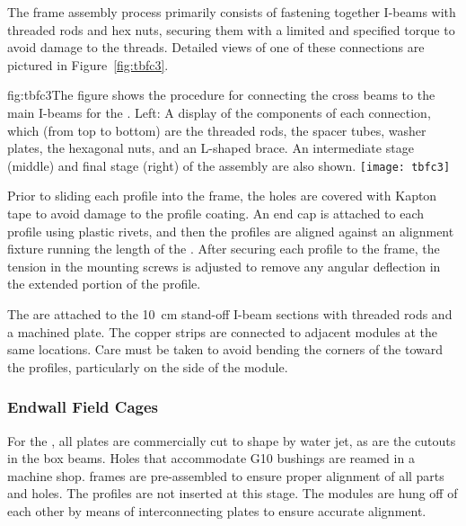 The  frame assembly process primarily consists of fastening together  I-beams with  threaded rods and hex nuts,  securing them with a limited and specified torque to avoid damage to the threads. Detailed views of one of these connections are pictured in Figure~\ref{fig:tbfc3}.

\begin{dunefigure}{fig:tbfc3}{The figure shows the procedure for connecting the cross beams to the main I-beams for the . Left: A display of the components of each connection, which (from top to bottom) are the threaded rods, the spacer tubes, washer plates, the hexagonal nuts, and an L-shaped  brace. An intermediate stage (middle) and final stage (right) of the assembly are also shown.}
\texttt{[image: tbfc3]}
\end{dunefigure}

Prior to sliding each profile into the  frame, the holes %
are covered with Kapton tape to avoid damage to the profile coating. An end cap is attached to each profile using plastic rivets, and then the profiles are aligned against an alignment fixture running the length of the . After securing each profile to the frame, the tension in the mounting screws is adjusted to remove any angular deflection in the extended portion of the profile.

The  are attached to the \SI{10}{\cm} stand-off I-beam sections with threaded rods and a machined plate. The copper strips are connected to adjacent modules at the same locations. Care must be taken to avoid bending the corners of the  toward the profiles, particularly on the  side of the module.

\subsubsection{Endwall Field Cages}
\label{sec:fdsp-hv-prod-fc-endw}

For the , all  plates are commercially cut to shape by water jet, as are the cutouts in the  box beams. %
Holes that accommodate G10 bushings are reamed in a machine shop.  frames are pre-assembled to ensure proper alignment of all  parts and %
holes. The profiles are not inserted at this stage. The  modules are hung off of each other by means of interconnecting  plates to ensure accurate alignment.

